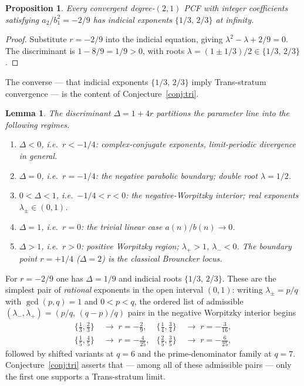 \documentclass[11pt]{amsart}
\newtheorem{proposition}[theorem]{Proposition}
\newtheorem{lemma}[theorem]{Lemma}
\theoremstyle{definition}
\theoremstyle{remark}
\begin{document}
\begin{proposition}\label{prop:trivial}
Every convergent degree-$(2,1)$ PCF with integer coefficients
satisfying $a_2/b_1^2 = -2/9$ has indicial exponents
$\{1/3,\, 2/3\}$ at infinity.
\end{proposition}
\begin{proof}
Substitute $r = -2/9$ into the indicial equation, giving
$\lambda^2 - \lambda + 2/9 = 0$.  The discriminant is $1 - 8/9 =
1/9 > 0$, with roots $\lambda = (1 \pm 1/3)/2 \in \{1/3,\, 2/3\}$.
\end{proof}

The converse --- that indicial exponents $\{1/3,\,2/3\}$ imply
Trans-stratum convergence --- is the content of
Conjecture~\ref{conj:tri}.

\begin{lemma}\label{lem:strata}
The discriminant $\Delta = 1 + 4r$ partitions the parameter line
into the following regimes.
\begin{enumerate}[label={\upshape(\roman*)}]
\item $\Delta < 0$, i.e.\ $r < -1/4$: complex-conjugate exponents,
limit-periodic divergence in general.
\item $\Delta = 0$, i.e.\ $r = -1/4$: the negative parabolic
boundary; double root $\lambda = 1/2$.
\item $0 < \Delta < 1$, i.e.\ $-1/4 < r < 0$: the
\emph{negative-Worpitzky interior}; real exponents
$\lambda_\pm \in (0,1)$.
\item $\Delta = 1$, i.e.\ $r = 0$: the trivial linear case
$a(n)/b(n) \to 0$.
\item $\Delta > 1$, i.e.\ $r > 0$: positive Worpitzky region;
$\lambda_+ > 1$, $\lambda_- < 0$.  The boundary point $r = +1/4$
($\Delta = 2$) is the classical Brouncker locus.
\end{enumerate}
\end{lemma}

For $r = -2/9$ one has $\Delta = 1/9$ and indicial roots
$\{1/3,\,2/3\}$.  These are the simplest pair of \emph{rational}
exponents in the open interval $(0,1)$: writing $\lambda_\pm = p/q$
with $\gcd(p,q) = 1$ and $0 < p < q$, the ordered list of admissible
$(\lambda_-, \lambda_+) = (p/q,\,(q-p)/q)$ pairs in the negative
Worpitzky interior begins
\begin{align*}
  \{\tfrac{1}{3},\tfrac{2}{3}\} &\;\to\; r = -\tfrac{2}{9}, &
  \{\tfrac{1}{4},\tfrac{3}{4}\} &\;\to\; r = -\tfrac{3}{16}, \\
  \{\tfrac{1}{5},\tfrac{4}{5}\} &\;\to\; r = -\tfrac{4}{25}, &
  \{\tfrac{2}{5},\tfrac{3}{5}\} &\;\to\; r = -\tfrac{6}{25},
\end{align*}
followed by shifted variants at $q = 6$ and the prime-denominator
family at $q = 7$.  Conjecture~\ref{conj:tri} asserts that --- among
all of these admissible pairs --- only the first one supports a
Trans-stratum limit.
\end{document}
